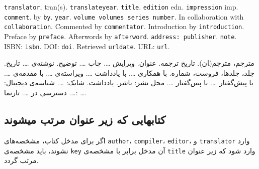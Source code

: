 \documentclass[a4paper,11pt]{article}
\begin{document}
\begin{itemize}[nosep]
\begin{latin}
\item[] []
{\tt translator}, tran(s). {\tt translateyear}. {\tt title}. {\tt edition} edn. {\tt impression} imp. {\tt comment}. by {\tt by}. {\tt year}. {\tt volume volumes series number}. In collaboration with {\tt collaboration}. Commented by {\tt commentator}. Introduction by {\tt introduction}. Preface by {\tt preface}. Afterwords by {\tt afterword}. {\tt address: publisher}. {\tt note}. ISBN: {\tt isbn}. DOI: {\tt doi}. Retrieved {\tt urldate}. URL: {\tt url}. 
\end{latin}

\item[] []
{\persianttfamily مترجم}، مترجم(‍ان). {\persianttfamily تاریخ ترجمه}. {\persianttfamily عنوان}. ویرایش {\persianttfamily …}. چاپ {\persianttfamily …}. {\persianttfamily توضیح}. نوشته‌ی {\persianttfamily …}. {\persianttfamily تاریخ}. {\persianttfamily جلد، جلدها، فروست، شماره}. با همکاری {\persianttfamily …}. با یادداشت {\persianttfamily …}. ویراسته‌ی {\persianttfamily …}. با مقدمه‌ی {\persianttfamily …}. با پیش‌گفتار {\persianttfamily …}. با پس‌گفتار {\persianttfamily …}. {\persianttfamily محل نشر: ناشر}. {\persianttfamily یادداشت}. شابک: {\persianttfamily …}. شناسه‌ی دیجیتال: {\persianttfamily …}. دسترسی در {\persianttfamily …}. تارنما: {\persianttfamily …}.
\end{itemize}





\subsection{کتابهایی که زیر عنوان مرتب میشوند}
اگر برای مدخل کتاب، مشخصه‌های \verb|author|، \verb|compiler|، \verb|editor|، و \verb|translator| وارد نشوند، باید مشخصه‌ی \verb|key| آن مدخل برابر با مشخصه‌ی \verb|title| وارد شود که زیر عنوان مرتب گردد.
\end{document}
